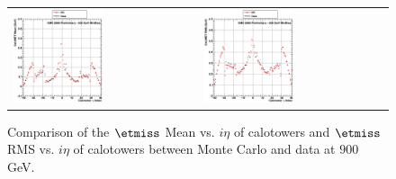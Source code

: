 \begin{figure}[h!]
 \centering
 \begin{tabular}{ll}
  \includegraphics[width=0.5\textwidth]{plots_DataVsMC_MB_900GeV/g_calometPtMean_vs_ieta_900.eps} &
  \includegraphics[width=0.5\textwidth]{plots_DataVsMC_MB_900GeV/g_calometPtRMS_vs_ieta_900.eps} \\
 \end{tabular}
 \caption{\small Comparison of the $\etmiss$ Mean vs. $i\eta$ of calotowers and $\etmiss$ RMS vs. $i\eta$ of calotowers between 
          Monte Carlo and data at $900$ GeV.\label{fig:MET_MeanRMS_vs_ieta_900}}
\end{figure}

